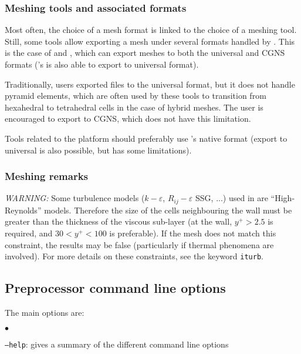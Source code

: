 {{{%
\subsubsection{Meshing tools and associated formats}

Most often, the choice of a mesh format is linked to the choice of
a meshing tool. Still, some tools allow exporting a mesh under several
formats handled by \CS. This is the case of \fluent and \icemcfd,
which can export meshes to both the \ideas universal and CGNS formats
(\fluent's \gambit is also able to export to \ideas universal format).

Traditionally, users exported files to the \ideas universal format,
but it does not handle pyramid elements, which are often used by these
tools to transition from hexahedral to tetrahedral cells in the case
of hybrid meshes. The user is encouraged to export to CGNS, which
does not have this limitation.

Tools related to the \salome platform should preferably use
\salome{}'s native \med format (export to \ideas universal is
also possible, but has some limitations).

\subsubsection{Meshing remarks}
\label{sec:prg_meshes}%

{\em WARNING: }
Some turbulence models ($k-\varepsilon$, $R_{ij}-\varepsilon$ SSG, ...) used in
\CS are ``High-Reynolds'' models. Therefore the size of the cells
neighbouring the wall must be greater than the thickness of the viscous
sub-layer (at the wall, $y^+>2.5$ is required, and $30<y^+<100$ is
preferable). If the mesh does not match this constraint, the results may
be false (particularly if thermal phenomena are involved). For more details
on these constraints, see the keyword \texttt{iturb}.

\subsection{Preprocessor command line options}
\label{sec:prg_optappelecs}%
The main options are:
\begin{list}{$\bullet$}{}
\item \texttt{--help}: gives a summary of the different command line options


\end{list}}}}

